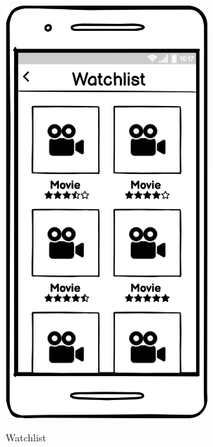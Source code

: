 \documentclass[12pt, a4paper]{article}
\numberwithin{figure}{section}
\begin{document}
\begin{center}
	\begin{minipage}{0.31\textwidth}
		\begin{figure}[H]
			\centering
			\includegraphics[width=0.68\textwidth]{images/mockups/Watchlist.png}\\
			\caption{Watchlist}
		\end{figure}
	\end{minipage}
	\hspace{0.01\linewidth}
	\begin{minipage}{0.33\textwidth}
		\begin{figure}[H]
			\centering

\end{figure}
\end{minipage}
\end{center}
\end{document}
